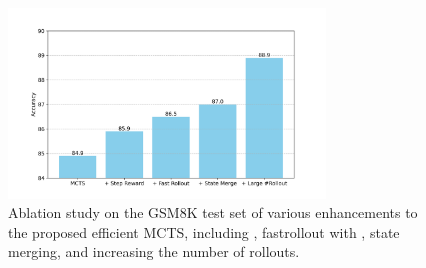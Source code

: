 \begin{figure}[htbp]
    \centering
    \includegraphics[width=0.75\textwidth]{figures/mcts_ablation.png}
    \caption{Ablation study on the GSM8K test set of various enhancements to the proposed efficient MCTS, including \prm{}, fastrollout with \orm{}, state merging, and increasing the number of rollouts.}
    \label{fig:search_ablation}
\end{figure}


